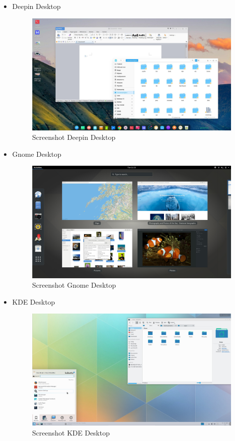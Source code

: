 \documentclass[12pt,]{article}
\begin{document}
\begin{itemize}
		\newpage
		\item Deepin Desktop
		\begin{figure}[H]
			\centering
			\includegraphics[width=0.8\linewidth]{images/vbox_de/deepin}
			\caption{Screenshot Deepin Desktop}
		\end{figure}

		\item Gnome Desktop
		\begin{figure}[H]
			\centering
			\includegraphics[width=0.8\linewidth]{images/vbox_de/gnome}
			\caption{Screenshot Gnome Desktop}
		\end{figure}

		\item KDE Desktop
		\begin{figure}[H]
			\centering
			\includegraphics[width=0.8\linewidth]{images/vbox_de/kde4}
			\caption{Screenshot KDE Desktop}
		\end{figure}


\end{itemize}
\end{document}
